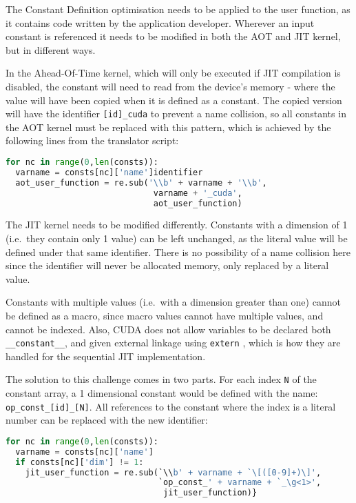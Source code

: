  The Constant Definition optimisation needs to be applied to the user function, as it contains code written by the application developer. Wherever an input constant is referenced it needs to be modified in both the AOT and JIT kernel, but in different ways.

In the Ahead-Of-Time kernel, which will only be executed if JIT compilation is disabled, the constant will need to read from the device's memory - where the value will have been copied when it is defined as a constant. The copied version will have the identifier \verb|[id]_cuda| to prevent a name collision, so all constants in the AOT kernel must be replaced with this pattern, which is achieved by the following lines from the translator script:\\
\begin{lstlisting}[backgroundcolor = \color{lightgray!20}, language=Python]
for nc in range(0,len(consts)):
  varname = consts[nc]['name']identifier
  aot_user_function = re.sub('\\b' + varname + '\\b',
                              varname + '_cuda',
                              aot_user_function)
\end{lstlisting}

The JIT kernel needs to be modified differently. Constants with a dimension of 1 (i.e.\ they contain only 1 value) can be left unchanged, as the literal value will be defined under that same identifier. There is no possibility of a name collision here since the identifier will never be allocated memory, only replaced by a literal value.
\par
Constants with multiple values (i.e.\ with a dimension greater than one) cannot be defined as a macro, since macro values cannot have multiple values, and cannot be indexed. Also, CUDA does not allow variables to be declared both \verb|__constant__|, and given external linkage using \verb|extern| \cite[p126]{guide}, which is how they are handled for the sequential JIT implementation.
\par
The solution to this challenge comes in two parts. For each index \verb|N| of the constant array, a 1 dimensional constant would be defined with the name:\\ \verb|op_const_[id]_[N]|. All references to the constant where the index is a literal number can be replaced with the new identifier:
\begin{lstlisting}[backgroundcolor = \color{lightgray!20}, language=Python]
for nc in range(0,len(consts)):
  varname = consts[nc]['name']
  if consts[nc]['dim'] != 1:
    jit_user_function = re.sub(`\\b' + varname + `\[([0-9]+)\]',
                               `op_const_' + varname + `_\g<1>',
                                jit_user_function)}
\end{lstlisting}

